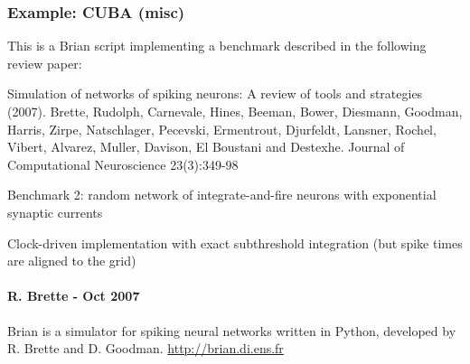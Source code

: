 \documentclass[letterpaper,10pt,english]{manual}
\begin{document}
\hypertarget{index-34}{}\subsubsection{Example: CUBA (misc)}

This is a Brian script implementing a benchmark described
in the following review paper:

Simulation of networks of spiking neurons: A review of tools and strategies (2007).
Brette, Rudolph, Carnevale, Hines, Beeman, Bower, Diesmann, Goodman, Harris, Zirpe,
Natschlager, Pecevski, Ermentrout, Djurfeldt, Lansner, Rochel, Vibert, Alvarez, Muller,
Davison, El Boustani and Destexhe.
Journal of Computational Neuroscience 23(3):349-98

Benchmark 2: random network of integrate-and-fire neurons with exponential synaptic currents

Clock-driven implementation with exact subthreshold integration
(but spike times are aligned to the grid)


\paragraph{R. Brette - Oct 2007}

Brian is a simulator for spiking neural networks written in Python, developed by
R. Brette and D. Goodman.
\href{http://brian.di.ens.fr}{http://brian.di.ens.fr}
\end{document}
